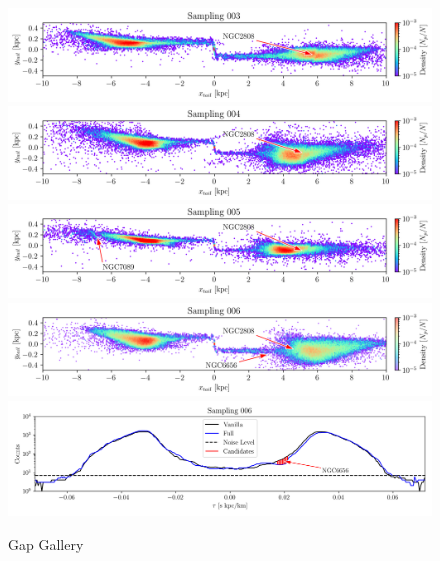 \documentclass{aa}
\begin{document}
\begin{appendix}
    \begin{figure}
      \centering
      \includegraphics[width=\linewidth]{gallery_of_gaps_monte-carlo-003.png}      
      \includegraphics[width=\linewidth]{gallery_of_gaps_monte-carlo-004.png}
      \includegraphics[width=\linewidth]{gallery_of_gaps_monte-carlo-005.png}
      \includegraphics[width=\linewidth]{gallery_of_gaps_monte-carlo-006.png}
      \includegraphics[width=\linewidth]{tau-profile-monte-carlo-006.png}
      \caption{Gap Gallery}
      \label{fig:gallery1}
      \end{figure}        



\end{appendix}
\end{document}

